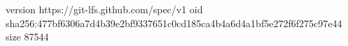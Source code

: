 version https://git-lfs.github.com/spec/v1
oid sha256:477bf6306a7d4b39e2bf9337651c0cd185ca4b4a6d4a1bf5e272f6f275c97e44
size 87544
